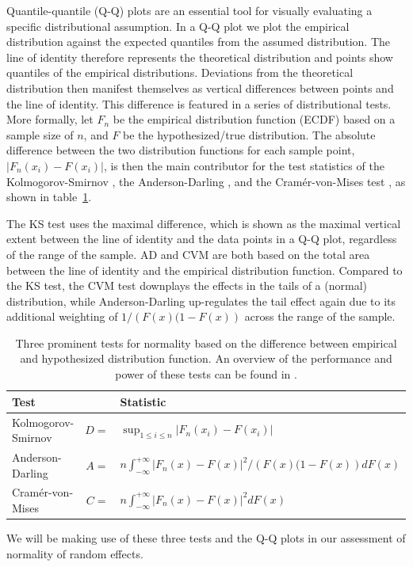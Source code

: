 \documentclass[12pt]{article} %
\begin{document}
Quantile-quantile (Q-Q) plots \citep{Wilk:1968} are an essential tool for  visually evaluating a specific distributional assumption. In a Q-Q plot we plot the empirical distribution against the expected quantiles from the assumed distribution. The line of identity therefore represents the theoretical distribution and points show quantiles of the empirical distributions. Deviations from the theoretical distribution then manifest themselves as vertical differences between points and the line of identity. This difference is featured in a series of distributional tests. More formally, let $F_n$ be the empirical distribution function (ECDF) based on a sample size of $n$, and $F$ be the hypothesized/true distribution. The absolute difference between the two distribution functions for each sample point, $\left| F_n(x_i) - F(x_i) \right|$, is then the main contributor for the test statistics of the Kolmogorov-Smirnov \cite[KS-test,][]{kolmogorov:1933, smirnov:1948}, the Anderson-Darling \citep[AD-test,][]{adtest:1954}, and the Cram\'{e}r-von-Mises test \citep[CVM-test,][]{cramer:1928, mises:1928}, as shown in table~\ref{tab:tests}.

The KS test uses the maximal  difference, which is shown as the maximal vertical extent between the line of identity and the data points in a Q-Q plot, regardless of the range of the sample.  AD and CVM  are both based on the total area between the line of identity and the empirical distribution function. Compared to the KS  test,  the CVM test downplays the effects in the tails of a (normal) distribution, while Anderson-Darling up-regulates the tail effect again due to its additional weighting of $1/\left(F(x)(1 - F(x)\right)$ across the range of the sample. 
\begin{table}
\begin{tabular}{lrl}\hline
Test && Statistic\\\hline\hline
Kolmogorov-Smirnov & $D =$ & $ \sup_{1 \le i \le n} \left | F_n(x_i) - F(x_i)\right|$ \\
Anderson-Darling & $A =$ & $ n \int_{-\infty}^{+\infty} \left | F_n(x) - F(x)\right|^2/\left(F(x)(1 - F(x)\right) dF(x)$\\
Cram\'{e}r-von-Mises & $C =$ & $n \int_{-\infty}^{+\infty} \left | F_n(x) - F(x)\right|^2 dF(x)$ \\\hline
\end{tabular}
\caption{\label{tab:tests} Three prominent tests for normality based on the difference between empirical and hypothesized distribution function. An overview of the performance and power of these tests can be found in \citet{stephens:1974}.}
\end{table}
%
We will be making use of these three tests and the Q-Q plots in our assessment of normality of random effects.
\end{document}

